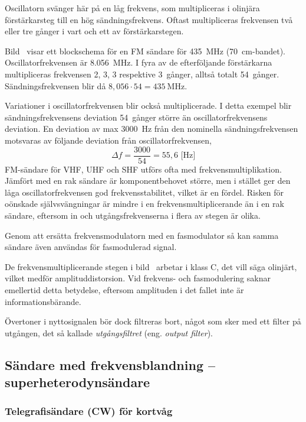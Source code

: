 Oscillatorn svänger här på en låg frekvens, som multipliceras i
olinjära förstärkarsteg till en hög sändningsfrekvens.
Oftast multipliceras frekvensen två eller tre gånger i vart och ett av
förstärkarstegen.

Bild~ visar ett blockschema för en FM sändare för
\qty{435}{\mega\hertz} (\qty{70}{\centi\metre}-bandet).
Oscillatorfrekvensen är \qty{8,056}{\mega\hertz}.
I fyra av de efterföljande förstärkarna multipliceras frekvensen 2, 3, 3
respektive 3~gånger, alltså totalt 54~gånger.
Sändningsfrekvensen blir då \(8,056 \cdot 54 = \qty{435}{\mega\hertz}\).

Variationer i oscillatorfrekvensen blir också multiplicerade.
I detta exempel blir sändningsfrekvensens deviation 54~gånger större än
oscillatorfrekvensens deviation.
En deviation av max \qty{3000}{\hertz} från den nominella sändningsfrekvensen
motsvaras av följande deviation från oscillatorfrekvensen,
\[\Delta f = \frac{3000}{54} = 55,6\text{ [Hz]}\]
FM-sändare för VHF, UHF och SHF utförs ofta med
frekvensmultiplikation.
Jämfört med en rak sändare är komponentbehovet större, men i stället ger
den låga oscillatorfrekvensen god frekvensstabilitet, vilket är en fördel.
Risken för oönskade självsvängningar är mindre i en frekvensmultiplicerande
än i en rak sändare, eftersom in och utgångsfrekvenserna i flera av stegen är
olika.

Genom att ersätta frekvensmodulatorn med en fasmodulator så kan samma
sändare även användas för fasmodulerad signal.

De frekvensmultiplicerande stegen i bild~ arbetar i klass C,
det vill säga olinjärt, vilket medför amplituddistorsion.
Vid frekvens- och fasmodulering saknar emellertid detta betydelse, eftersom
amplituden i det fallet inte är informationsbärande.

Övertoner i nyttosignalen bör dock filtreras bort, något som sker med ett
filter på utgången, det så kallade \emph{utgångsfiltret}
(eng. \emph{output filter}).


\newpage
\subsection{Sändare med frekvensblandning -- superheterodynsändare}
\label{sändare_frekvensblandning}

\subsubsection{Telegrafisändare (CW) för kortvåg}

